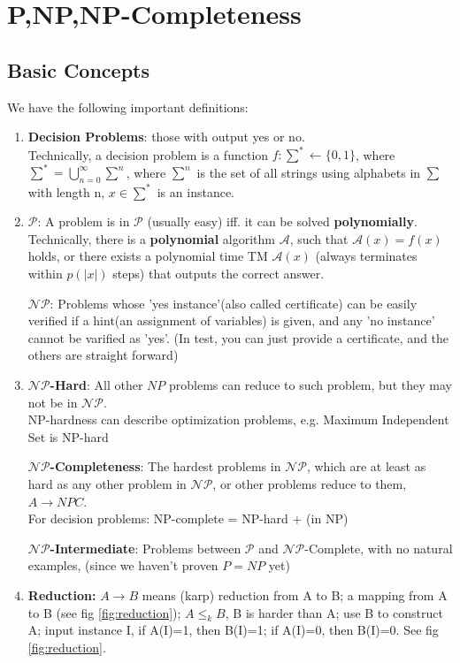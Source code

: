 \section{P,NP,NP-Completeness}
\subsection{Basic Concepts}
We have the following important definitions:
\begin{enumerate}
\item \textbf{Decision Problems}: those with output yes or no. \\
Technically, a decision problem is a function $f: \sum ^* \leftarrow \{0,1\}$, where $\sum^*=\bigcup _{n=0}^\infty \sum^n$, where $\sum^n$ is the set of all strings using alphabets in $\sum$ with length n, $x\in \sum^*$ is an instance.
\item \textbf{$\mathcal{P}$}: A problem is in $\mathcal{P}$ (usually easy) iff. it can be solved \textbf{polynomially}. \\
Technically, there is a \textbf{polynomial} algorithm $\mathcal{A}$, such that $\mathcal{A}(x)=f(x)$ holds, or there exists a polynomial time TM $\mathcal{A}(x)$ (always terminates within $p(|x|)$ steps) that outputs the correct answer.

$\mathcal{NP}$: Problems whose 'yes instance'(also called certificate) can be easily verified if a hint(an assignment of variables) is given, and any 'no instance' cannot be varified as 'yes'. (In test, you can just provide a certificate, and the others are straight forward)

\item \textbf{$\mathcal{NP}$-Hard}: All other $NP$ problems can reduce to such problem, but they may not be in $\mathcal{NP}$. \\NP-hardness can describe optimization problems, e.g. Maximum Independent Set is NP-hard

\textbf{$\mathcal{NP}$-Completeness}: The hardest problems in $\mathcal{NP}$, which are at least as hard as any other problem in $\mathcal{NP}$, or other problems reduce to them, $A \rightarrow NPC$.\\
 For decision problems: NP-complete = NP-hard + (in NP)

\textbf{ $\mathcal{NP}$-Intermediate}: Problems between $\mathcal{P}$ and $\mathcal{NP}$-Complete, with no natural examples, (since we haven't proven $P=NP$ yet)
\item \textbf{Reduction:} $A\rightarrow B$ means (karp) reduction from A to B; a mapping from A to B (see fig \ref{fig:reduction}); $A \leq _k B$, B is harder than A; use B to construct A; input instance I, if A(I)=1, then B(I)=1; if A(I)=0, then B(I)=0. See fig \ref{fig:reduction}.
 

\end{enumerate}
